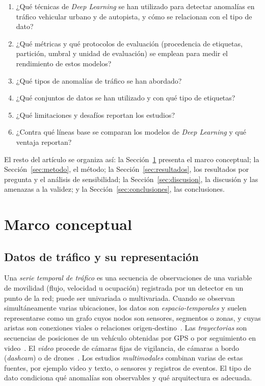 \documentclass[12pt, a4paper]{article}
\begin{document}
\begin{preguntabox}
  \begin{enumerate}[label=\textbf{RQ\arabic*:}, leftmargin=3em]
    \item ¿Qué técnicas de \textit{Deep Learning} se han utilizado para detectar anomalías en tráfico vehicular urbano y de autopista, y cómo se relacionan con el tipo de dato?
    \item ¿Qué métricas y qué protocolos de evaluación (procedencia de etiquetas, partición, umbral y unidad de evaluación) se emplean para medir el rendimiento de estos modelos?
    \item ¿Qué tipos de anomalías de tráfico se han abordado?
    \item ¿Qué conjuntos de datos se han utilizado y con qué tipo de etiquetas?
    \item ¿Qué limitaciones y desafíos reportan los estudios?
    \item ¿Contra qué líneas base se comparan los modelos de \textit{Deep Learning} y qué ventaja reportan?
  \end{enumerate}
\end{preguntabox}

El resto del artículo se organiza así: la Sección~\ref{sec:marco} presenta el marco conceptual; la Sección~\ref{sec:metodo}, el método; la Sección~\ref{sec:resultados}, los resultados por pregunta y el análisis de sensibilidad; la Sección~\ref{sec:discusion}, la discusión y las amenazas a la validez; y la Sección~\ref{sec:conclusiones}, las conclusiones.

\section{Marco conceptual}
\label{sec:marco}

\subsection{Datos de tráfico y su representación}

Una \textit{serie temporal de tráfico} es una secuencia de observaciones de una variable de movilidad (flujo, velocidad u ocupación) registrada por un detector en un punto de la red; puede ser univariada o multivariada. Cuando se observan simultáneamente varias ubicaciones, los datos son \textit{espacio-temporales} y suelen representarse como un grafo cuyos nodos son sensores, segmentos o zonas, y cuyas aristas son conexiones viales o relaciones origen-destino~\cite{djenouri2019survey}. Las \textit{trayectorias} son secuencias de posiciones de un vehículo obtenidas por GPS o por seguimiento en video~\cite{belhadi2020trajectory}. El \textit{video} procede de cámaras fijas de vigilancia, de cámaras a bordo (\textit{dashcam}) o de drones~\cite{santhosh2020anomaly}. Los estudios \textit{multimodales} combinan varias de estas fuentes, por ejemplo video y texto, o sensores y registros de eventos. El tipo de dato condiciona qué anomalías son observables y qué arquitectura es adecuada.
\end{document}
